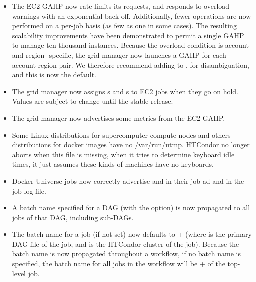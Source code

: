 \begin{itemize}

\item The EC2 GAHP now rate-limits its requests, and responds to overload
warnings with an exponential back-off.  Additionally, fewer operations are
now performed on a per-job basis (as few as one in some cases).  The
resulting scalability improvements have been demonstrated to permit a single
GAHP to manage ten thousand instances.  Because the overload condition is
account- and region- specific, the grid manager now launches a GAHP for
each account-region pair.  We therefore recommend adding  to
, for disambiguation, and this is now the default.

\item The grid manager now assigns s and
s to EC2 jobs when they go on hold.  Values are
subject to change until the stable release.

\item The grid manager now advertises some metrics from the EC2 GAHP.

\item Some Linux distributions for supercomputer compute nodes and
others distributions for docker images have no /var/run/utmp. HTCondor no longer
aborts when this file is missing, when it tries to determine keyboard
idle times, it just assumes these kinds of machines have no keyboards.

\item Docker Universe jobs now correctly advertise 
and  in their job ad and in the job log file.

\item A batch name specified for a DAG (with the 
 option) is now propagated to all jobs of that DAG,
including sub-DAGs.

\item The batch name for a  job (if not set) now
defaults to + (where 
is the primary DAG file of the  job, and 
is the HTCondor cluster of the  job).
Because the batch name is now propagated throughout a workflow, if
no batch name is specified, the batch name for all jobs in the
workflow will be + of the top-level
 job.


\end{itemize}

